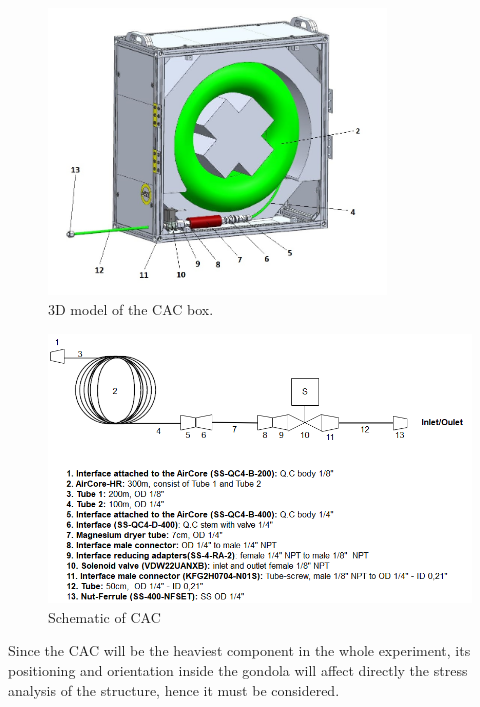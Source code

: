 \begin{figure}[H]
    \centering
    \includegraphics[width=0.8\textwidth]{4-experiment-design/img/Mechanical/CAC_interior_labels.jpg}
    \caption{3D model of the CAC box.}
    \label{fig:CAC-cad-model}
\end{figure}

\begin{figure}[H]
    \centering
    \includegraphics[width=1\textwidth]{4-experiment-design/img/CAC-schematic-v3.PNG}
    \caption{Schematic of CAC}
    \label{fig:CAC-schematic}
\end{figure}

Since the CAC will be the heaviest component in the whole experiment, its positioning and orientation inside the gondola will affect directly the stress analysis of the structure, hence it must be considered.

